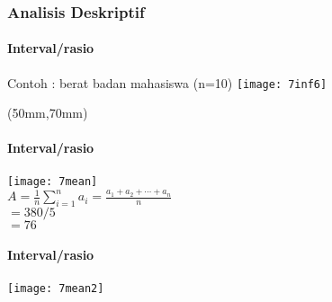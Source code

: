 \documentclass[../main.tex]{subfiles}
\begin{document}
\begin{frame}[label=two,t,mybg=bg,mytitle=standard,light]%
	\frametitle{Analisis Deskriptif }
	\framesubtitle{Interval/rasio }
	Contoh : berat badan mahasiswa  (n=10)
	\texttt{[image: 7inf6]}
	{\small

		\begin{textblock*}{50mm}(50mm,70mm)
		\end{textblock*}}
	\vspace{1cm}
	{\small	{}}

\end{frame}

\begin{frame}[t,mybg=bg,mytitle=standard,light]%
	\framesubtitle{Interval/rasio }

	\texttt{[image: 7mean]}\\
	${\displaystyle A={\frac {1}{n}}\sum _{i=1}^{n}a_{i}={\frac {a_{1}+a_{2}+\cdots +a_{n}}{n}}}$\\
	$ = 380 / 5 $\\
	$ = 76$

\end{frame}

\begin{frame}[t,mybg=bg1,mytitle=standard,light]%
	\framesubtitle{Interval/rasio }

	\texttt{[image: 7mean2]}
\end{frame}
\end{document}
